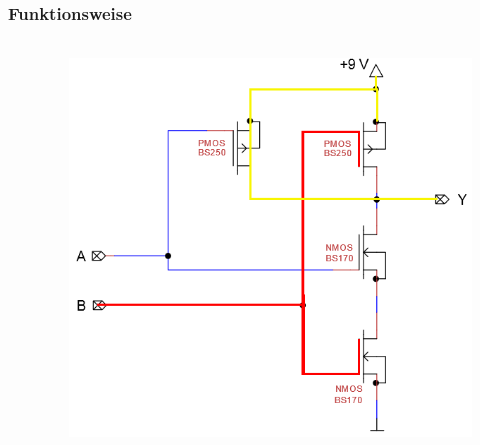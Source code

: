 \begin{frame}
    \frametitle{Funktionsweise}
    \framesubtitle{}
    \begin{columns}[c]
            \begin{center}
            \end{center}
            \begin{figure}[H]
            \begin{center}
                    \includegraphics[scale=0.5]{./img/schaltung/cmos_fun_01.png}
            \end{center}
            \end{figure}    
    \end{columns}
\end{frame}
